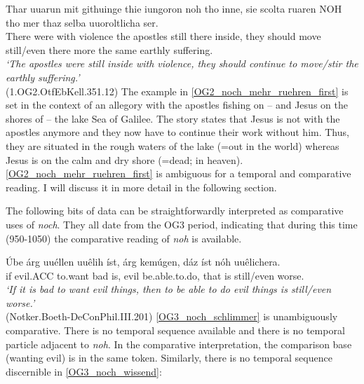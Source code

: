 \documentclass[output=paper,
modfonts
]{langscibook}
\begin{document}
\ea\gll Thar uuarun mit githuinge thie iungoron noh tho inne, sie scolta ruaren NOH tho mer thaz selba uuoroltlicha ser.\\
       There were with violence the apostles still there inside, they should move still/even there more the same earthly suffering.\\
\glt   \textit{`The apostles were still inside with violence, they should continue to move/stir the earthly suffering.'}\label{OG2_noch_mehr_ruehren_first} \\ \flushright \vspace{-24pt} (1.OG2.OtfEbKell.351.12)
\z
The example in \ref{OG2_noch_mehr_ruehren_first} is set in the context of an allegory with the apostles fishing on -- and Jesus on the shores of -- the lake Sea of Galilee. The story states that Jesus is not with the apostles anymore and they now have to continue their work without him. Thus, they are situated in the rough waters of the lake (=out in the world) whereas Jesus is on the calm and dry shore (=dead; in heaven). \ref{OG2_noch_mehr_ruehren_first} is ambiguous for a temporal and comparative reading. I will discuss it in more detail in the following section.

The following bits of data can be straightforwardly interpreted as comparative uses of \textit{noch}. They all date from the OG3 period, indicating that during this time (950-1050) the comparative reading of \textit{noh} is available.

\ea\gll Úbe árg uuéllen uuêlih íst, árg kemúgen, dáz íst nóh uuêlichera.\\
       if evil.ACC to.want bad is, evil be.able.to.do, that is still/even worse.\\%
\glt   \textit{`If it is bad to want evil things, then to be able to do evil things is still/even worse.'}\label{OG3_noch_schlimmer} \\ \flushright \vspace{-24pt} (Notker.Boeth-DeConPhil.III.201)
\z
\ref{OG3_noch_schlimmer} is unambiguously comparative. There is no temporal sequence available and there is no temporal particle adjacent to \textit{noh}. In the comparative interpretation, the comparison base (wanting evil) is in the same token. Similarly, there is no temporal sequence discernible in \ref{OG3_noch_wissend}:
\end{document}
